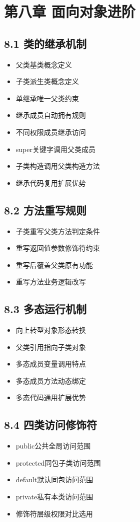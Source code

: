 \section{第八章 面向对象进阶}
\subsection{8.1 类的继承机制}
\begin{itemize}
\item 父类基类概念定义
\item 子类派生类概念定义
\item 单继承唯一父类约束
\item 继承成员自动拥有规则
\item 不同权限成员继承访问
\item super关键字调用父类成员
\item 子类构造调用父类构造方法
\item 继承代码复用扩展优势
\end{itemize}

\subsection{8.2 方法重写规则}
\begin{itemize}
\item 子类重写父类方法判定条件
\item 重写返回值参数修饰符约束
\item 重写后覆盖父类原有功能
\item 重写方法业务逻辑改写
\end{itemize}

\subsection{8.3 多态运行机制}
\begin{itemize}
\item 向上转型对象形态转换
\item 父类引用指向子类对象
\item 多态成员变量调用特点
\item 多态成员方法动态绑定
\item 多态代码通用扩展优势
\end{itemize}

\subsection{8.4 四类访问修饰符}
\begin{itemize}
\item public公共全局访问范围
\item protected同包子类访问范围
\item default默认同包访问范围
\item private私有本类访问范围
\item 修饰符层级权限对比选用
\end{itemize}

